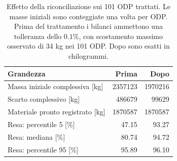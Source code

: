 \begin{table}[htbp]
\centering
\small
\begin{tabularx}{\linewidth}{@{}Xrr@{}}
\toprule
\textbf{Grandezza} & \textbf{Prima} & \textbf{Dopo} \\
\midrule
Massa iniziale complessiva [kg] & \num{2357123} & \num{1970216} \\
Scarto complessivo [kg] & \num{486679} & \num{99629} \\
Materiale pronto registrato [kg] & \num{1870587} & \num{1870587} \\
Resa: percentile 5 [\%] & \num{47.15} & \num{93.27} \\
Resa: mediana [\%] & \num{80.74} & \num{94.72} \\
Resa: percentile 95 [\%] & \num{95.89} & \num{96.10} \\
\bottomrule
\end{tabularx}
\caption{Effetto della riconciliazione sui 101 ODP trattati. Le masse iniziali sono conteggiate una volta per ODP. Prima del trattamento i bilanci ammettono una tolleranza dello $0.1\%$, con scostamento massimo osservato di 34 kg nei 101 ODP. Dopo sono esatti in chilogrammi.}
\label{tab:mass-imputation-effects}
\end{table}
